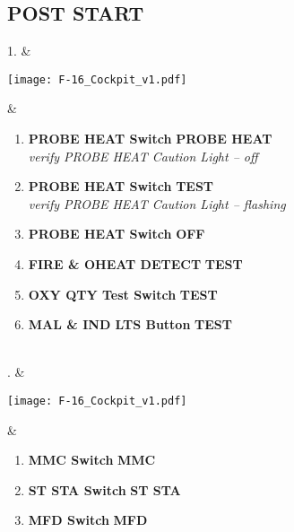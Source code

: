 \documentclass[fontInter]{TechCheck}
\begin{document}
	\subsection{POST START}
	\begin{listlongtable}
		1. & 
		\begin{minipage}[t]{\linewidth}
			\vspace{-7pt}
			\centering
			\texttt{[image: F-16\_Cockpit\_v1.pdf]}
		\end{minipage} &
		\begin{minipage}[t]{\linewidth}
			\vspace{-7pt}
			\begin{enumerate}
				\item \textbf{PROBE HEAT Switch} \dotfill \textbf{PROBE HEAT} \\
				\hfill \emph{verify PROBE HEAT Caution Light -- off}
				\item \textbf{PROBE HEAT Switch} \dotfill \textbf{TEST} \\
				\hfill \emph{verify PROBE HEAT Caution Light -- flashing}
				\item \textbf{PROBE HEAT Switch} \dotfill \textbf{OFF}
				\item \textbf{FIRE \& OHEAT DETECT} \dotfill \textbf{TEST}
				\item \textbf{OXY QTY Test Switch} \dotfill \textbf{TEST}
				\item \textbf{MAL \& IND LTS Button} \dotfill \textbf{TEST}
			\end{enumerate}
		\end{minipage} \\
		. & 
		\begin{minipage}[t]{\linewidth}
			\vspace{-7pt}
			\centering
			\texttt{[image: F-16\_Cockpit\_v1.pdf]}
		\end{minipage} &
		\begin{minipage}[t]{\linewidth}
			\vspace{-7pt}
			\begin{enumerate}
				\item \textbf{MMC Switch} \dotfill \textbf{MMC}
				\item \textbf{ST STA Switch} \dotfill \textbf{ST STA}
				\item \textbf{MFD Switch} \dotfill \textbf{MFD}

\end{enumerate}
\end{minipage}
\end{listlongtable}
\end{document}
